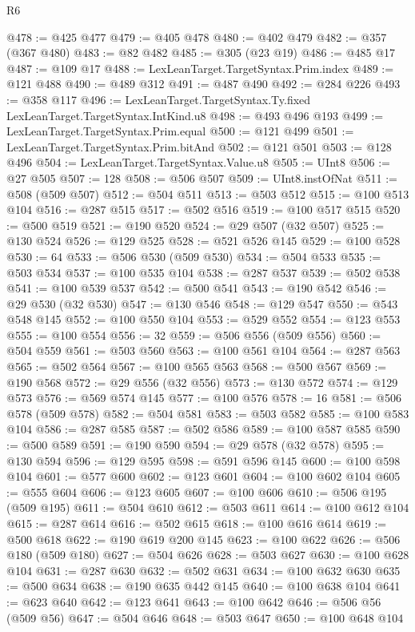 \begin{lexlean}{R6}
\begin{coremodule}
@478 := @425 @477
@479 := @405 @478
@480 := @402 @479
@482 := @357 (@367 @480)
@483 := @82 @482
@485 := @305 (@23 @19)
@486 := @485 @17
@487 := @109 @17
@488 := LexLeanTarget.TargetSyntax.Prim.index
@489 := @121 @488
@490 := @489 @312
@491 := @487 @490
@492 := @284 @226
@493 := @358 @117
@496 := LexLeanTarget.TargetSyntax.Ty.fixed LexLeanTarget.TargetSyntax.IntKind.u8
@498 := @493 @496 @193
@499 := LexLeanTarget.TargetSyntax.Prim.equal
@500 := @121 @499
@501 := LexLeanTarget.TargetSyntax.Prim.bitAnd
@502 := @121 @501
@503 := @128 @496
@504 := LexLeanTarget.TargetSyntax.Value.u8
@505 := UInt8
@506 := @27 @505
@507 := 128
@508 := @506 @507
@509 := UInt8.instOfNat
@511 := @508 (@509 @507)
@512 := @504 @511
@513 := @503 @512
@515 := @100 @513 @104
@516 := @287 @515
@517 := @502 @516
@519 := @100 @517 @515
@520 := @500 @519
@521 := @190 @520
@524 := @29 @507 (@32 @507)
@525 := @130 @524
@526 := @129 @525
@528 := @521 @526 @145
@529 := @100 @528
@530 := 64
@533 := @506 @530 (@509 @530)
@534 := @504 @533
@535 := @503 @534
@537 := @100 @535 @104
@538 := @287 @537
@539 := @502 @538
@541 := @100 @539 @537
@542 := @500 @541
@543 := @190 @542
@546 := @29 @530 (@32 @530)
@547 := @130 @546
@548 := @129 @547
@550 := @543 @548 @145
@552 := @100 @550 @104
@553 := @529 @552
@554 := @123 @553
@555 := @100 @554
@556 := 32
@559 := @506 @556 (@509 @556)
@560 := @504 @559
@561 := @503 @560
@563 := @100 @561 @104
@564 := @287 @563
@565 := @502 @564
@567 := @100 @565 @563
@568 := @500 @567
@569 := @190 @568
@572 := @29 @556 (@32 @556)
@573 := @130 @572
@574 := @129 @573
@576 := @569 @574 @145
@577 := @100 @576
@578 := 16
@581 := @506 @578 (@509 @578)
@582 := @504 @581
@583 := @503 @582
@585 := @100 @583 @104
@586 := @287 @585
@587 := @502 @586
@589 := @100 @587 @585
@590 := @500 @589
@591 := @190 @590
@594 := @29 @578 (@32 @578)
@595 := @130 @594
@596 := @129 @595
@598 := @591 @596 @145
@600 := @100 @598 @104
@601 := @577 @600
@602 := @123 @601
@604 := @100 @602 @104
@605 := @555 @604
@606 := @123 @605
@607 := @100 @606
@610 := @506 @195 (@509 @195)
@611 := @504 @610
@612 := @503 @611
@614 := @100 @612 @104
@615 := @287 @614
@616 := @502 @615
@618 := @100 @616 @614
@619 := @500 @618
@622 := @190 @619 @200 @145
@623 := @100 @622
@626 := @506 @180 (@509 @180)
@627 := @504 @626
@628 := @503 @627
@630 := @100 @628 @104
@631 := @287 @630
@632 := @502 @631
@634 := @100 @632 @630
@635 := @500 @634
@638 := @190 @635 @442 @145
@640 := @100 @638 @104
@641 := @623 @640
@642 := @123 @641
@643 := @100 @642
@646 := @506 @56 (@509 @56)
@647 := @504 @646
@648 := @503 @647
@650 := @100 @648 @104

\end{coremodule}
\end{lexlean}
